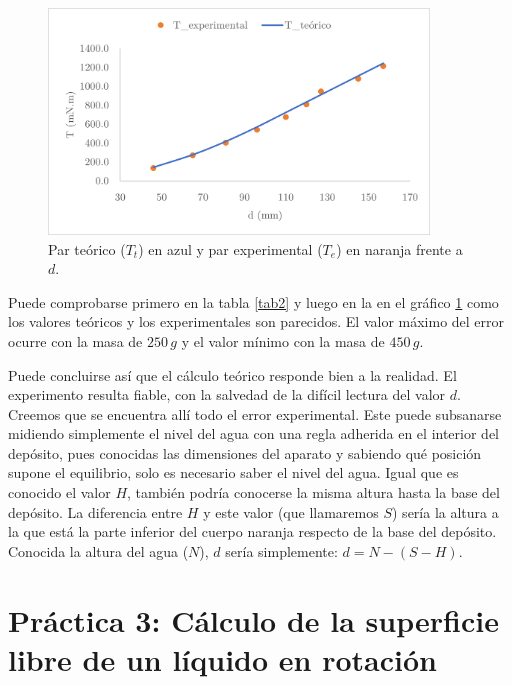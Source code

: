 \documentclass[12pt,a4paper]{article}
\begin{document}
\begin{figure}[H]
 	 \begin{center}
  \includegraphics[width=0.9\textwidth]{fotos/grafico_2}
  	 \end{center}
  	 \vspace{-0.3cm}
  	\caption{Par teórico ($T_{t}$) en azul y par experimental ($T_{e}$) en naranja frente a $d$.}
  	\label{fig5}
  	\vspace{-0.2cm}
\end{figure}

Puede comprobarse primero en la tabla \ref{tab2} y luego en la en el gráfico \ref{fig5} como los valores teóricos y los experimentales son parecidos. El valor máximo del error ocurre con la masa de $250\,g$ y el valor mínimo con la masa de $450\,g$. 

Puede concluirse así que el cálculo teórico responde bien a la realidad. El experimento resulta fiable, con la salvedad de la difícil lectura del valor $d$. Creemos que se encuentra allí todo el error experimental. Este puede subsanarse midiendo simplemente el nivel del agua con una regla adherida en el interior del depósito, pues conocidas las dimensiones del aparato y sabiendo qué posición supone el equilibrio, solo es necesario saber el nivel del agua. Igual que es conocido el valor $H$, también podría conocerse la misma altura hasta la base del depósito. La diferencia entre $H$ y este valor (que llamaremos $S$) sería la altura a la que está la parte inferior del cuerpo naranja respecto de la base del depósito. Conocida la altura del agua ($N$), $d$ sería simplemente: $d=N-(S-H)$.



\newpage
\section*{Práctica 3: Cálculo de la superficie libre de un líquido en rotación}
\end{document}
